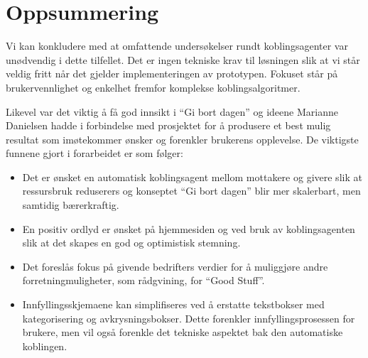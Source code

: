\section{Oppsummering}
Vi kan konkludere med at omfattende undersøkelser rundt koblingsagenter var unødvendig i dette tilfellet. Det er ingen tekniske krav til løsningen slik at vi står veldig fritt når det gjelder implementeringen av prototypen. Fokuset står på brukervennlighet og enkelhet fremfor komplekse koblingsalgoritmer.

Likevel var det viktig å få god innsikt i ``Gi bort dagen'' og ideene Marianne Danielsen hadde i forbindelse med prosjektet for å produsere et best mulig resultat som imøtekommer ønsker og forenkler brukerens opplevelse. De viktigste funnene gjort i forarbeidet  er som følger:

\begin{itemize}
    \item Det er ønsket en automatisk koblingsagent mellom mottakere og givere slik at ressursbruk reduserers og konseptet ``Gi bort dagen'' blir mer skalerbart, men samtidig bærerkraftig.
    \item En positiv ordlyd er ønsket på hjemmesiden og ved bruk av koblingsagenten slik at det skapes en god og optimistisk stemning.
    \item Det foreslås fokus på givende bedrifters verdier for å muliggjøre andre forretningmuligheter, som rådgvining, for ``Good Stuff''.
    \item Innfyllingsskjemaene kan simplifiseres ved å erstatte tekstbokser med kategorisering og avkrysningsbokser. Dette forenkler innfyllingsprosessen for brukere, men vil også forenkle det tekniske aspektet bak den automatiske koblingen.
\end{itemize}
